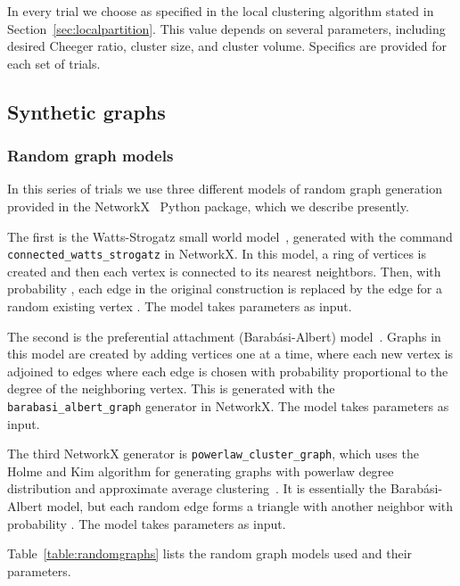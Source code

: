 \documentclass[runningheads,a4paper]{llncs}
\begin{document}
In every trial we choose  as specified in the local clustering
algorithm stated in Section~\ref{sec:localpartition}.  This value depends on
several parameters, including desired Cheeger ratio, cluster size, and cluster
volume.  Specifics are provided for each set of trials.


\subsection{Synthetic graphs}
\label{sec:synthranking}

\subsubsection{Random graph models}
In this series of trials we use three different models of random graph
generation provided in the NetworkX~\cite{networkx} Python package, which we
describe presently.

The first is the Watts-Strogatz small world model~\cite{wattsstrogatz},
generated with the command \texttt{connected_watts_strogatz} in NetworkX.  In
this model, a ring of  vertices is created and then each vertex is connected
to its  nearest neightbors.  Then, with probability , each edge  in
the original construction is replaced by the edge  for a random existing
vertex .  The model takes parameters  as input.

The second is the preferential attachment (Barab\'{a}si-Albert)
model~\cite{barabasialbert}.  Graphs in this model are created by adding 
vertices one at a time, where each new vertex is adjoined to  edges where
each edge is chosen with probability proportional to the degree of the
neighboring vertex.  This is generated with the \texttt{barabasi_albert_graph}
generator in NetworkX.  The model takes parameters  as input.

The third NetworkX generator is \texttt{powerlaw_cluster_graph}, which uses the
Holme and Kim algorithm for generating graphs with powerlaw degree distribution
and approximate average clustering~\cite{holmekim}.  It is essentially the
Barab\'{a}si-Albert model, but each random edge forms a triangle with another
neighbor with probability .  The model takes parameters  as input.

Table~\ref{table:randomgraphs} lists the random graph models used and their
parameters.
\end{document}
